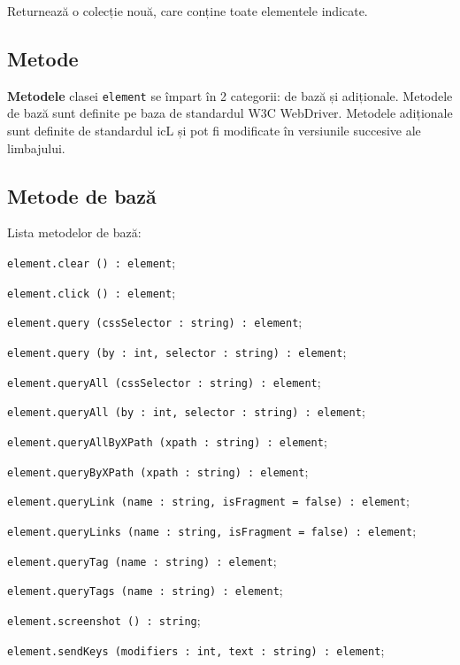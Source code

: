 Returnează o colecție nouă, care conține toate elementele indicate.

\subsection{Metode}

{\bf Metodele} clasei \texttt{element} se împart în 2 categorii: de bază și adiționale. Metodele de bază sunt definite pe baza de standardul W3C WebDriver. Metodele adiționale sunt definite de standardul icL și pot fi modificate în versiunile succesive ale limbajului.

\subsection{Metode de bază}

Lista metodelor de bază:
\begin{icItems}
\item \texttt{element.clear () : element};
\item \texttt{element.click () : element};
\item \texttt{element.query (cssSelector : string) : element};
\item \texttt{element.query (by : int, selector : string) : element};
\item \texttt{element.queryAll (cssSelector : string) : element};
\item \texttt{element.queryAll (by : int, selector : string) : element};
\item \texttt{element.queryAllByXPath (xpath : string) : element};
\item \texttt{element.queryByXPath (xpath : string) : element};
\item \texttt{element.queryLink (name : string, isFragment = false) : element};
\item \texttt{element.queryLinks (name : string, isFragment = false) : element};
\item \texttt{element.queryTag (name : string) : element};
\item \texttt{element.queryTags (name : string) : element};
\item \texttt{element.screenshot () : string};
\item \texttt{element.sendKeys (modifiers : int, text : string) : element};
\end{icItems}

